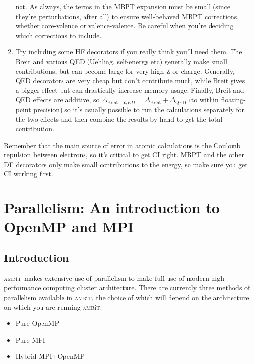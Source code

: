 \documentclass{report}
\newcommand{\ambit}{\textsc{amb}{\footnotesize i}\textsc{t}}
\begin{document}
\begin{enumerate}
  not. As always, the terms in the MBPT expansion must be small (since they're perturbations, after all)
  to ensure well-behaved MBPT corrections, whether core-valence or valence-valence. Be careful when
  you're deciding which corrections to include.
\item
  Try including some HF decorators if you really think you'll need them.
  The Breit and various QED (Uehling, self-energy etc) generally make
  small contributions, but can become large for very high Z or charge.
  Generally, QED decorators are very cheap but don't contribute much,
  while Breit gives a bigger effect but can drastically increase memory
  usage. Finally, Breit and QED effects are additive, so $\Delta_{\mathrm{Breit} +
  QED} = \Delta_{\mathrm{Breit}} + \Delta_{\mathrm{QED}}$ (to within floating-point precision) so it's
  usually possible to run the calculations separately for the two effects and then combine the results 
  by hand to get the total contribution.
\end{enumerate}

Remember that the main source of error in atomic calculations is the Coulomb repulsion between
electrons, so it's critical to get CI right. MBPT and the other DF decorators only make small 
contributions to the energy, so make sure you get CI working first.


\chapter{Parallelism: An introduction to OpenMP and MPI}
\label{chap:HPC}

\section{Introduction}
\ambit ~makes extensive use of parallelism to make full use of modern high-performance computing cluster
architecture. There are currently three methods of parallelism available in \ambit, the choice of which
will depend on the architecture on which you are running \ambit:

\begin{itemize}
    \item Pure OpenMP
    \item Pure MPI
    \item Hybrid MPI+OpenMP
\end{itemize}
\end{document}
